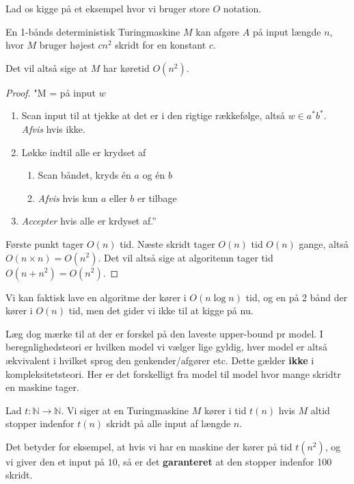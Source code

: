 Lad os kigge på et eksempel hvor vi bruger store $O$ notation.

\begin{theorem}
	En 1-bånds deterministisk Turingmaskine $M$ kan afgøre $A$ på input længde $n$, hvor $M$ bruger højest $cn^{2}$ skridt for en konstant $c$.
\end{theorem}

Det vil altså sige at $M$ har køretid $O(n^{2})$.

\begin{proof}
	"M = på input $w$
	\begin{enumerate}
		\item Scan input til at tjekke at det er i den rigtige rækkefølge, altså $w \in a^{*}b^{*}$. \textit{Afvis} hvis ikke.

		\item Løkke indtil alle er krydset af
		      \begin{enumerate}
			      \item Scan båndet, kryds én $a$ og én $b$
			      \item \textit{Afvis} hvis kun $a$ eller $b$ er tilbage
		      \end{enumerate}
		\item \textit{Accepter} hvis alle er krdyset af.''
	\end{enumerate}

	Første punkt tager $O(n)$ tid.
	Næste skridt tager $O(n)$ tid $O(n)$ gange, altså $O(n \times n) = O(n^{2})$. Det vil altså sige at algoritemn tager tid $O(n + n^{2}) = O(n^{2})$.
\end{proof}

Vi kan faktisk lave en algoritme der kører i $O(n \log n)$ tid, og en på 2 bånd der kører i $O(n)$ tid, men det gider vi ikke til at kigge på nu.

Læg dog mærke til at der er forskel på den laveste upper-bound pr model. I beregnlighedsteori er hvilken model vi vælger lige gyldig, hver model er altså ækvivalent i hvilket sprog den genkender/afgører etc. Dette gælder \textbf{ikke} i kompleksitetsteori. Her er det forskelligt fra model til model hvor mange skridtr en maskine tager.

\begin{definition}
	Lad $t: \mathbb{N} \longrightarrow \mathbb{N}$. Vi siger at en Turingmaskine $M$ kører i tid $t(n)$ hvis $M$ altid stopper indenfor $t(n)$ skridt på alle input af længde $n$.
\end{definition}

Det betyder for eksempel, at hvis vi har en maskine der kører på tid $t(n^{2})$, og vi giver den et input på $10$, så er det \textbf{garanteret} at den stopper indenfor 100 skridt.

